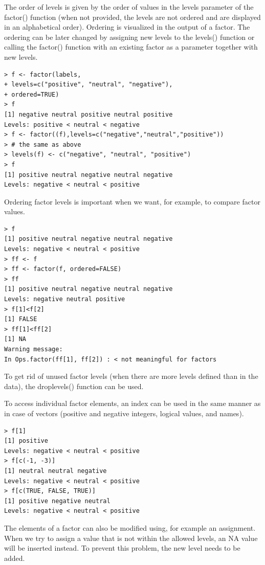 \documentclass[10pt]{book}
\begin{document}
The order of levels is given by the order of values in the levels parameter of the factor() function (when not provided, the levels are not ordered and are displayed in an alphabetical order). Ordering is visualized in the output of a factor. The ordering can be later changed by assigning new levels to the levels() function or calling the factor() function with an existing factor as a parameter together with new levels.

\begin{verbatim}
> f <- factor(labels,
+ levels=c("positive", "neutral", "negative"),
+ ordered=TRUE)
> f
[1] negative neutral positive neutral positive
Levels: positive < neutral < negative
> f <- factor((f),levels=c("negative","neutral","positive"))
> # the same as above
> levels(f) <- c("negative", "neutral", "positive")
> f
[1] positive neutral negative neutral negative
Levels: negative < neutral < positive
\end{verbatim}

Ordering factor levels is important when we want, for example, to compare factor values.

\begin{verbatim}
> f
[1] positive neutral negative neutral negative
Levels: negative < neutral < positive
> ff <- f
> ff <- factor(f, ordered=FALSE)
> ff
[1] positive neutral negative neutral negative
Levels: negative neutral positive
> f[1]<f[2]
[1] FALSE
> ff[1]<ff[2]
[1] NA
Warning message:
In Ops.factor(ff[1], ff[2]) : < not meaningful for factors
\end{verbatim}

To get rid of unused factor levels (when there are more levels defined than in the data), the droplevels() function can be used.

To access individual factor elements, an index can be used in the same manner as in case of vectors (positive and negative integers, logical values, and names).

\begin{verbatim}
> f[1]
[1] positive
Levels: negative < neutral < positive
> f[c(-1, -3)]
[1] neutral neutral negative
Levels: negative < neutral < positive
> f[c(TRUE, FALSE, TRUE)]
[1] positive negative neutral
Levels: negative < neutral < positive
\end{verbatim}

The elements of a factor can also be modified using, for example an assignment. When we try to assign a value that is not within the allowed levels, an NA value will be inserted instead. To prevent this problem, the new level needs to be added.
\end{document}

